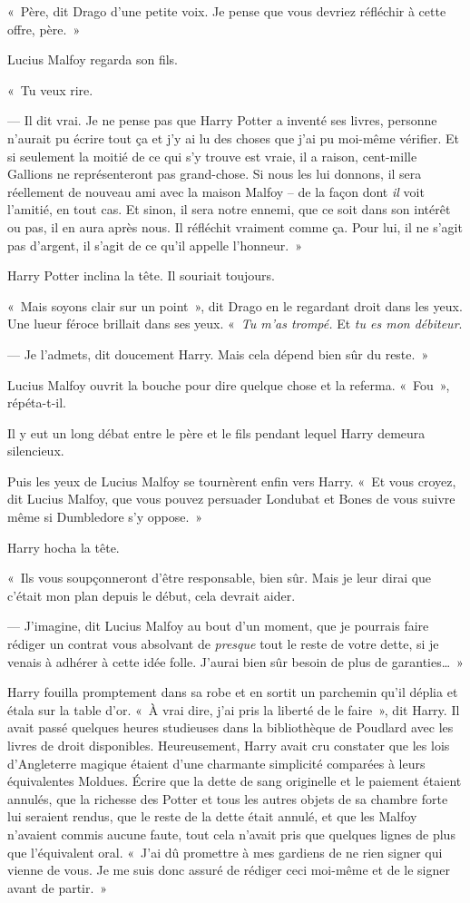 «~Père, dit Drago d'une petite voix. Je pense que vous devriez réfléchir à cette offre, père.~»

Lucius Malfoy regarda son fils.

«~Tu veux rire.

--- Il dit vrai. Je ne pense pas que Harry Potter a inventé ses livres, personne n'aurait pu écrire tout ça et j'y ai lu des choses que j'ai pu moi-même vérifier. Et si seulement la moitié de ce qui s'y trouve est vraie, il a raison, cent-mille Gallions ne représenteront pas grand-chose. Si nous les lui donnons, il sera réellement de nouveau ami avec la maison Malfoy -- de la façon dont \emph{il} voit l'amitié, en tout cas. Et sinon, il sera notre ennemi, que ce soit dans son intérêt ou pas, il en aura après nous. Il réfléchit vraiment comme ça. Pour lui, il ne s'agit pas d'argent, il s'agit de ce qu'il appelle l'honneur.~»

Harry Potter inclina la tête. Il souriait toujours.

«~Mais soyons clair sur un point~», dit Drago en le regardant droit dans les yeux. Une lueur féroce brillait dans ses yeux. «~\emph{Tu m'as trompé.} Et \emph{tu es mon débiteur}.

--- Je l'admets, dit doucement Harry. Mais cela dépend bien sûr du reste.~»

Lucius Malfoy ouvrit la bouche pour dire quelque chose et la referma. «~Fou~», répéta-t-il.

Il y eut un long débat entre le père et le fils pendant lequel Harry demeura silencieux.

Puis les yeux de Lucius Malfoy se tournèrent enfin vers Harry. «~Et vous croyez, dit Lucius Malfoy, que vous pouvez persuader Londubat et Bones de vous suivre même si Dumbledore s'y oppose.~»

Harry hocha la tête.

«~Ils vous soupçonneront d'être responsable, bien sûr. Mais je leur dirai que c'était mon plan depuis le début, cela devrait aider.

--- J'imagine, dit Lucius Malfoy au bout d'un moment, que je pourrais faire rédiger un contrat vous absolvant de \emph{presque} tout le reste de votre dette, si je venais à adhérer à cette idée folle. J'aurai bien sûr besoin de plus de garanties…~»

Harry fouilla promptement dans sa robe et en sortit un parchemin qu'il déplia et étala sur la table d'or. «~À vrai dire, j'ai pris la liberté de le faire~», dit Harry. Il avait passé quelques heures studieuses dans la bibliothèque de Poudlard avec les livres de droit disponibles. Heureusement, Harry avait cru constater que les lois d'Angleterre magique étaient d'une charmante simplicité comparées à leurs équivalentes Moldues. Écrire que la dette de sang originelle et le paiement étaient annulés, que la richesse des Potter et tous les autres objets de sa chambre forte lui seraient rendus, que le reste de la dette était annulé, et que les Malfoy n'avaient commis aucune faute, tout cela n'avait pris que quelques lignes de plus que l'équivalent oral. «~J'ai dû promettre à mes gardiens de ne rien signer qui vienne de vous. Je me suis donc assuré de rédiger ceci moi-même et de le signer avant de partir.~»

